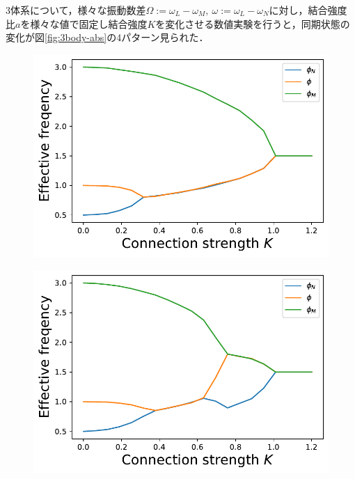 \documentclass[../main]{subfiles}
\begin{document}
3体系について，様々な振動数差$\Omega:=\omega_L-\omega_M,\ \omega:=\omega_L-\omega_N$に対し，結合強度比$a$を様々な値で固定し結合強度$K$を変化させる数値実験を行うと，同期状態の変化が図\ref{fig:3body-abs}の4パターン見られた．
\captionsetup[figure]{justification=centering}
\begin{figure}[tbp]
    \begin{minipage}[b]{0.47\linewidth}
        \centering
        \includegraphics[keepaspectratio, scale=0.42]{images/three-body-prob-notapprox-a150.pdf}
        \label{fig:3body-notapprox150}
    \end{minipage}
    \begin{minipage}[b]{0.47\linewidth}
      \centering
      \includegraphics[keepaspectratio, scale=0.42]{images/three-body-prob-notapprox-a175.pdf}

\end{minipage}
\end{figure}
\end{document}
